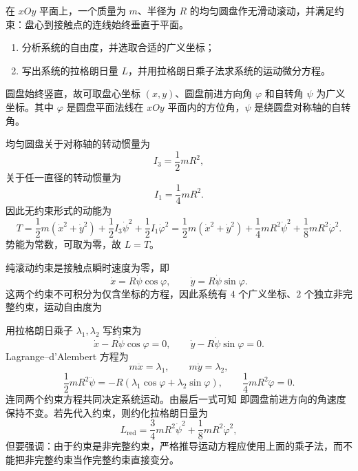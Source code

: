 \begin{question}[圆盘作无滑动滚动]
在 $xOy$ 平面上，一个质量为 $m$、半径为 $R$ 的均匀圆盘作无滑动滚动，并满足约束：盘心到接触点的连线始终垂直于平面。
\begin{enumerate}
  \item 分析系统的自由度，并选取合适的广义坐标；
  \item 写出系统的拉格朗日量 $L$，并用拉格朗日乘子法求系统的运动微分方程。
\end{enumerate}

\begin{solution}
圆盘始终竖直，故可取盘心坐标 $(x,y)$、圆盘前进方向角 $\varphi$ 和自转角 $\psi$ 为广义坐标。其中 $\varphi$ 是圆盘平面法线在 $xOy$ 平面内的方位角，$\psi$ 是绕圆盘对称轴的自转角。

均匀圆盘关于对称轴的转动惯量为
\[
  I_3=\frac12mR^2,
\]
关于任一直径的转动惯量为
\[
  I_1=\frac14mR^2.
\]
因此无约束形式的动能为
\[
  T=\frac12m(\dot x^2+\dot y^2)
    +\frac12 I_3\dot\psi^2+\frac12 I_1\dot\varphi^2
  =\frac12m(\dot x^2+\dot y^2)
    +\frac14mR^2\dot\psi^2+\frac18mR^2\dot\varphi^2 .
\]
势能为常数，可取为零，故 $L=T$。

纯滚动约束是接触点瞬时速度为零，即
\[
  \dot x=R\dot\psi\cos\varphi,
  \qquad
  \dot y=R\dot\psi\sin\varphi .
\]
这两个约束不可积分为仅含坐标的方程，因此系统有 $4$ 个广义坐标、$2$ 个独立非完整约束，运动自由度为

用拉格朗日乘子 $\lambda_1,\lambda_2$ 写约束为
\[
  \dot x-R\dot\psi\cos\varphi=0,
  \qquad
  \dot y-R\dot\psi\sin\varphi=0 .
\]
Lagrange--d'Alembert 方程为
\[
  m\ddot x=\lambda_1,
  \qquad
  m\ddot y=\lambda_2,
\]
\[
  \frac12mR^2\ddot\psi
  =-R(\lambda_1\cos\varphi+\lambda_2\sin\varphi),
  \qquad
  \frac14mR^2\ddot\varphi=0.
\]
连同两个约束方程共同决定系统运动。由最后一式可知
即圆盘前进方向的角速度保持不变。若先代入约束，则约化拉格朗日量为
\[
  L_{\mathrm{red} }
  =\frac34mR^2\dot\psi^2+\frac18mR^2\dot\varphi^2,
\]
但要强调：由于约束是非完整约束，严格推导运动方程应使用上面的乘子法，而不能把非完整约束当作完整约束直接变分。
\end{solution}

\end{question}

